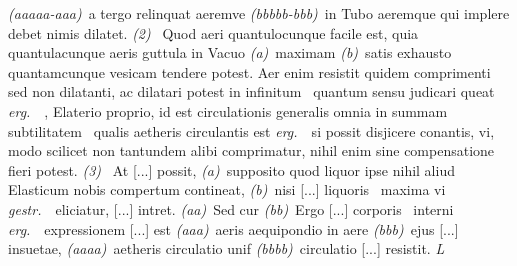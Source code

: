 {{\textit{(aaaaa-aaa)}\ a tergo relinquat aeremve \textit{(bbbbb-bbb)}\ in Tubo aeremque qui implere debet nimis dilatet. \textit{ (2) }\  Quod aeri quantulocunque facile est, quia quantulacunque aeris guttula in Vacuo \textit{(a)}\ maximam \textit{(b)}\ satis exhausto quantamcunque vesicam tendere potest. Aer enim resistit quidem comprimenti sed non dilatanti, ac dilatari potest in infinitum  \textbar\ quantum sensu judicari queat \textit{ erg.}\ \textbar\ , Elaterio\protect{} proprio, id est circulationis generalis omnia in summam subtilitatem  \textbar\ qualis aetheris\protect{} circulantis est \textit{ erg.}\ \textbar\ si possit disjicere conantis, vi, modo scilicet non tantundem alibi comprimatur, nihil enim sine compensatione fieri potest. \textit{ (3) }\ At [...] possit, \textit{(a)}\ supposito quod liquor ipse nihil aliud Elasticum nobis compertum contineat, \textit{(b)}\ nisi [...] liquoris \textbar\ maxima vi \textit{ gestr.}\ \textbar\ eliciatur, [...] intret. \textit{(aa)}\ Sed cur \textit{(bb)}\ Ergo [...] corporis \textbar\ interni \textit{ erg.}\ \textbar\ expressionem [...] est \textit{(aaa)}\ aeris aequipondio in aere \textit{(bbb)}\ ejus [...] insuetae, \textit{(aaaa)}\ aetheris\protect{} circulatio unif \textit{(bbbb)}\ circulatio [...] resistit. \textit{ L}}}
\pagebreak
